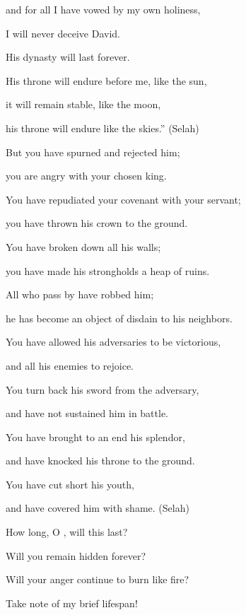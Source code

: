 {and for all I have vowed
by my own holiness,
\par }{\Q I will never
deceive
David.
\par }{\Q {}His dynasty
will last
forever.
\par }{\Q His throne
will endure before
me, like the sun,
\par }{\Q {}it will remain
stable,
like the moon,
\par }{\Q his throne
will endure
like the skies.”
(Selah)
\par }{\Q {}But you
have spurned
and rejected
him;
\par }{\Q you are angry
with
your chosen king.
\par }{\Q {}You have repudiated
your covenant
with your servant;
\par }{\Q you have thrown
his crown
to the ground.
\par }{\Q {}You have broken down
all
his walls;
\par }{\Q you have made
his strongholds
a heap of ruins.
\par }{\Q {}All
who pass
by have robbed
him;
\par }{\Q he has become
an object of disdain
to his neighbors.
\par }{\Q {}You have allowed
his adversaries
to be victorious,
\par }{\Q and all
his enemies
to rejoice.
\par }{\Q {}You turn back
his sword
from the adversary,
\par }{\Q and have not
sustained
him in battle.
\par }{\Q {}You have brought to an end
his splendor,
\par }{\Q and have knocked his throne
to the ground.
\par }{\Q {}You have cut short
his youth,
\par }{\Q and have covered
him with shame.
(Selah)
\par }{\Q {}How
long,
O
{}, will this last?
\par }{\Q Will you remain hidden
forever?


\par }{\Q Will your anger
continue to burn
like
fire?
\par }{\Q {}Take note
of my brief lifespan!

}
